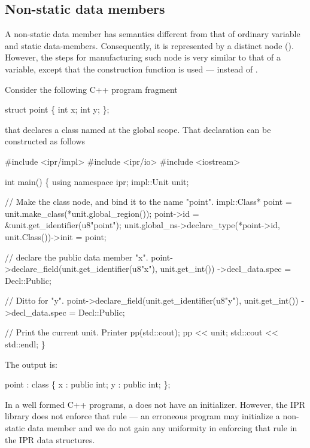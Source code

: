 \documentclass[11pt]{article}
\begin{document}
\subsection{Non-static data members}
\label{sec:named.data.nonstatic-member}

A non-static data member has semantics different from that of ordinary 
variable and static data-members.  Consequently, it is represented by a
distinct node ().  However, the steps for manufacturing such node
is very similar to that of a variable, except that the construction function 
 is used --- instead of .

Consider the following C++ program fragment
\begin{Program}
  struct point \{
    int x;
    int y;
  \};
\end{Program}
that declares a class named  at the global scope.  That
declaration can be constructed as follows
\begin{Program}
#include <ipr/impl>
#include <ipr/io>
#include <iostream>

int main()
\{
   using namespace ipr;
   impl::Unit unit;

   // Make the class node, and bind it to the name "point".
   impl::Class* point = unit.make_class(*unit.global_region());
   point->id = &unit.get_identifier(u8"point");
   unit.global_ns->declare_type(*point->id, unit.Class())->init = point;

   // declare the public data member "x".
   point->declare_field(unit.get_identifier(u8"x"), unit.get_int())
      ->decl_data.spec = Decl::Public;

   // Ditto for "y".
   point->declare_field(unit.get_identifier(u8"y"), unit.get_int())
      ->decl_data.spec = Decl::Public;

   // Print the current unit.
   Printer pp(std::cout);
   pp << unit;
   std::cout << std::endl;
\}
\end{Program}

The output is:
\begin{Program}
point : class \{
    x : public int;
    y : public int;
\};
\end{Program}
In a well formed C++ programs, a  does not have an initializer.
However, the IPR library does not enforce that rule --- an erroneous program
may initialize a non-static data member and we do not gain any uniformity in
enforcing that rule in the IPR data structures. 
\end{document}
